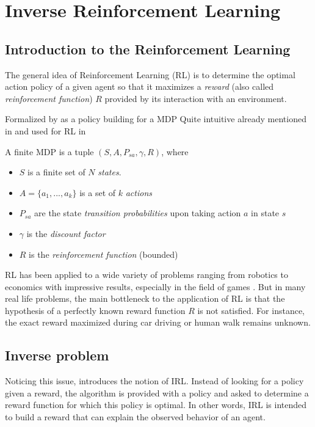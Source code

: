 \documentclass{article}
\begin{document}
\section{Inverse Reinforcement Learning \label{sec:irl}}

\subsection{Introduction to the Reinforcement Learning \label{sec:irl}}

The general idea of Reinforcement Learning (RL) is to determine the optimal action policy of a given agent so that it maximizes a \emph{reward} (also called \emph{reinforcement function}) $R$ provided by its interaction with an environment.

Formalized by \cite{Sutton98} as a policy building for a MDP
Quite intuitive already mentioned in \cite{Bellman57} and used for RL in \cite{Littman94} 

A finite MDP is a tuple $(S,A,P_{sa},\gamma,R)$, where
\begin{itemize}
    \item $S$ is a finite set of $N$ \emph{states}.
    \item $A=\{a_1,...,a_k\}$ is a set of $k$ \emph{actions} 
    \item $P_{sa}$ are the state \emph{transition probabilities} upon taking action $a$ in state $s$
    \item $\gamma$ is the \emph{discount factor}
    \item $R$ is the \emph{reinforcement function} (bounded) 
\end{itemize}

RL has been applied to a wide variety of problems ranging from robotics \cite{Kober13} to economics \cite{Tesauro02} with impressive results, especially in the field of games \cite{Silver16}. But in many real life problems, the main bottleneck to the application of RL is that the hypothesis of a perfectly known reward function $R$ is not satisfied. For instance, the exact reward maximized during car driving \cite{Shalev16} or human walk \cite{Morimoto04} remains unknown.

\subsection{Inverse problem}

Noticing this issue, \cite{Russell98} introduces the notion of IRL. Instead of looking for a policy given a reward, the algorithm is provided with a policy and asked to determine a reward function for which this policy is optimal. In other words, IRL is intended to build a reward that can explain the observed behavior of an agent.
\end{document}
